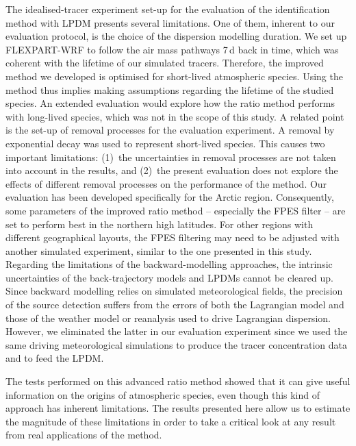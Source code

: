         The idealised-tracer experiment set-up for the evaluation of the identification method with LPDM presents several limitations.
            One of them, inherent to our evaluation protocol, is the choice of the dispersion modelling duration. We set up FLEXPART-WRF to follow the air mass pathways 7\,d back in time, which was coherent with the lifetime of our simulated tracers.
            Therefore, the improved method we developed is optimised for short-lived atmospheric species. Using the method thus implies making assumptions regarding the lifetime of the studied species.
            An extended evaluation would explore how the ratio method performs with long-lived species, which was not in the scope of this study.
            A related point is the set-up of removal processes for the evaluation experiment. A removal by exponential decay was used to represent short-lived species. This causes two important limitations: (1)~the uncertainties in removal processes are not taken into account in the results, and (2)~the present evaluation does not explore the effects of different removal processes on the performance of the method.
            Our evaluation has been developed specifically for the Arctic region. Consequently, some parameters of the improved ratio method -- especially the FPES filter -- are set to perform best in the northern high latitudes.
            For other regions with different geographical layouts, the FPES filtering may need to be adjusted with another simulated experiment, similar to the one presented in this study.
            Regarding the limitations of the backward-modelling approaches, the intrinsic uncertainties of the back-trajectory models and LPDMs cannot be cleared up. Since backward modelling relies on simulated meteorological fields, the precision of the source detection suffers from the errors of both the Lagrangian model and those of the weather model or reanalysis used to drive Lagrangian dispersion.
            However, we eliminated the latter in our evaluation experiment since we used the same driving meteorological simulations to produce the tracer concentration data and to feed the LPDM.

    The tests performed on this advanced ratio method showed that it can give useful information on the origins of atmospheric species, even though this kind of approach has inherent limitations.
    The results presented here allow us to estimate the magnitude of these limitations in order to take a critical look at any result from real applications of the method.

